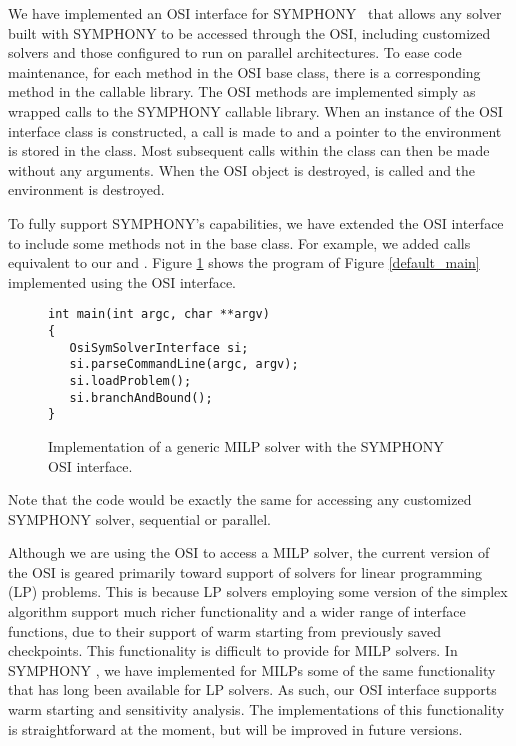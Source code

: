 We have implemented an OSI interface for SYMPHONY \VER\ that allows any solver
built with SYMPHONY to be accessed through the OSI, including customized
solvers and those configured to run on parallel architectures. To ease code
maintenance, for each method in the OSI base class, there is a corresponding
method in the callable library. The OSI methods are implemented simply as
wrapped calls to the SYMPHONY callable library. When an instance of the OSI
interface class is constructed, a call is made to
 and a pointer to the environment is stored
in the class. Most subsequent calls within the class can then be made without
any arguments. When the OSI object is destroyed,
 is called and the environment is destroyed.

To fully support SYMPHONY's capabilities, we have extended the OSI interface to
include some methods not in the base class. For example, we added calls
equivalent to our  and
. Figure \ref{OSI_main} shows the
program of Figure \ref{default_main} implemented using the OSI interface.
\begin{figure}[tb]
{\color{Brown}
\begin{Verbatim}[frame=lines]
int main(int argc, char **argv)
{
   OsiSymSolverInterface si;
   si.parseCommandLine(argc, argv);
   si.loadProblem();
   si.branchAndBound();
}
\end{Verbatim}
}
\caption{Implementation of a generic MILP solver with the SYMPHONY
OSI interface. \label{OSI_main}}
\end{figure}
Note that the code would be exactly the same for accessing any customized
SYMPHONY solver, sequential or parallel.

Although we are using the OSI to access a MILP solver, the current version of
the OSI is geared primarily toward support of solvers for linear programming
(LP) problems. This is because LP solvers employing some version of the
simplex algorithm support much richer functionality and a wider range of
interface functions, due to their support of warm starting from previously
saved checkpoints. This functionality is difficult to provide for MILP
solvers.  In SYMPHONY \VER, we have implemented for MILPs some of the same
functionality that has long been available for LP solvers. As such, our OSI
interface supports warm starting and sensitivity analysis. The implementations
of this functionality is straightforward at the moment, but will be improved
in future versions.

